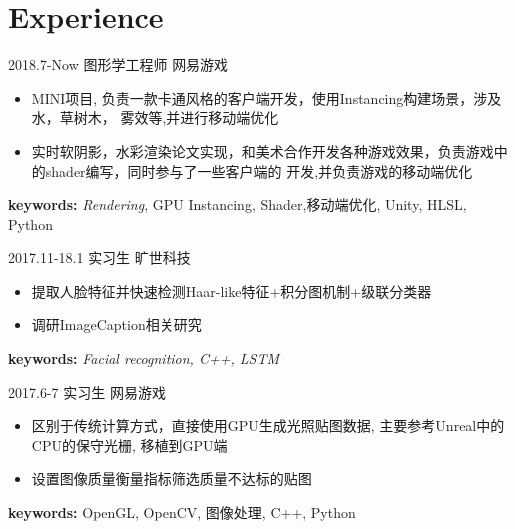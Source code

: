 \documentclass[]{cv-style} %
\begin{document}
\section{Experience}
\begin{entrylist}

\entry
  {2018.7-Now}
  {图形学工程师}
  {网易游戏}
  {
    \vspace{-5pt}
    \leftmargini=-1cm
    \begin{itemize}
      \setlength{\itemsep}{3pt}
      \item {MINI项目, 负责一款卡通风格的客户端开发，使用Instancing构建场景，涉及\\水，草树木，
      雾效等,并进行移动端优化}
      \item {实时软阴影，水彩渲染论文实现，和美术合作开发各种游戏效果，负责游戏中\\的shader编写，同时参与了一些客户端的
      开发,并负责游戏的移动端优化}
    \end{itemize}
    \vspace{5pt}
    \hspace{-1.2cm} \textbf{keywords:} \emph{Rendering}, GPU Instancing, Shader,移动端优化, Unity, HLSL, Python
  }

\entry
  {2017.11-18.1}
  {实习生}
  {旷世科技}
  {
    \vspace{-5pt}
    \leftmargini=-1cm
    \begin{itemize}
      \setlength{\itemsep}{3pt}
      \item {提取人脸特征并快速检测Haar-like特征+积分图机制+级联分类器}
      \item {调研ImageCaption相关研究}
    \end{itemize}
    \vspace{5pt}
    \hspace{-1.2cm} \textbf{keywords:} \emph{Facial recognition, C++, LSTM}
  }

\entry
  {2017.6-7}
  {实习生}
  {网易游戏}
  {
    \vspace{-5pt}
    \leftmargini=-1cm
    \begin{itemize}
      \setlength{\itemsep}{3pt}
      \item {区别于传统计算方式，直接使用GPU生成光照贴图数据, 主要参考Unreal中的\\CPU的保守光栅, 移植到GPU端}
      \item {设置图像质量衡量指标筛选质量不达标的贴图}
    \end{itemize}
    \vspace{5pt}
    \hspace{-1.2cm} \textbf{keywords:} OpenGL, OpenCV, 图像处理, C++, Python
  }


\end{entrylist}
\end{document}
